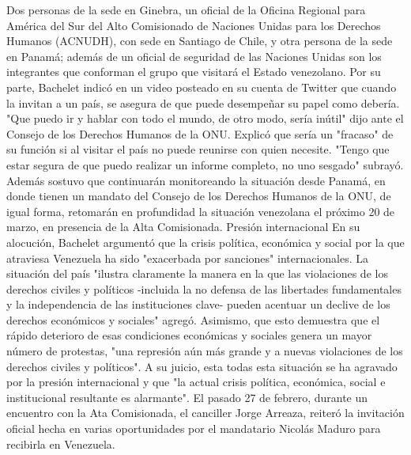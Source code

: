 \documentclass{article}%
\begin{document}
\newline%
%
Dos personas de la sede en Ginebra, un oficial de la Oficina Regional para América del Sur del Alto Comisionado de Naciones Unidas para los Derechos Humanos (ACNUDH), con sede en Santiago de Chile, y otra persona de la sede en Panamá; además de un oficial de seguridad de las Naciones Unidas son los integrantes que conforman el grupo que visitará el Estado venezolano.%
\newline%
%
Por su parte, Bachelet indicó en un video posteado en su cuenta de Twitter que cuando la invitan a un país, se asegura de que puede desempeñar su papel como debería. "Que puedo ir y hablar con todo el mundo, de otro modo, sería inútil" dijo ante el Consejo de los Derechos Humanos de la ONU.%
\newline%
%
Explicó que sería un "fracaso" de su función si al visitar el país no puede reunirse con quien necesite. "Tengo que estar segura de que puedo realizar un informe completo, no uno sesgado" subrayó.%
\newline%
%
Además sostuvo que continuarán monitoreando la situación desde Panamá, en donde tienen un mandato del Consejo de los Derechos Humanos de la ONU, de igual forma, retomarán en profundidad la situación venezolana el próximo 20 de marzo, en presencia de la Alta Comisionada.%
\newline%
%
Presión internacional%
\newline%
%
En su alocución, Bachelet argumentó que la crisis política, económica y social por la que atraviesa Venezuela ha sido "exacerbada por sanciones" internacionales. La situación del país "ilustra claramente la manera en la que las violaciones de los derechos civiles y políticos {-}incluida la no defensa de las libertades fundamentales y la independencia de las instituciones clave{-} pueden acentuar un declive de los derechos económicos y sociales" agregó.%
\newline%
%
Asimismo, que esto demuestra que el rápido deterioro de esas condiciones económicas y sociales genera un mayor número de protestas, "una represión aún más grande y a nuevas violaciones de los derechos civiles y políticos".%
\newline%
%
A su juicio, esta todas esta situación se ha agravado por la presión internacional y que "la actual crisis política, económica, social e institucional resultante es alarmante".%
\newline%
%
El pasado 27 de febrero, durante un encuentro con la Ata Comisionada, el canciller Jorge Arreaza, reiteró la invitación oficial hecha en varias oportunidades por el mandatario Nicolás Maduro para recibirla en Venezuela.%
\end{document}
